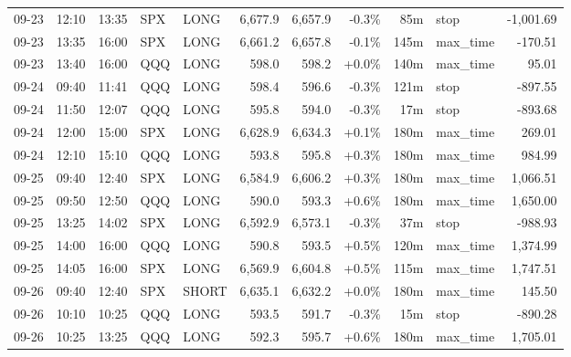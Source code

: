 \documentclass[11pt,a4paper,twoside]{article}
\begin{document}
\begin{center}
\begin{longtable}{>{\color{txtmain}}l l l l l r r r r >{\color{txtmain}}l r}
09-23 & 12:10 & 13:35 & SPX & LONG & 6,677.9 & 6,657.9 & \textcolor{lossred}{-0.3\%} & 85m & stop & \textcolor{lossred}{-1,001.69} \\
09-23 & 13:35 & 16:00 & SPX & LONG & 6,661.2 & 6,657.8 & \textcolor{lossred}{-0.1\%} & 145m & max\_time & \textcolor{lossred}{-170.51} \\
09-23 & 13:40 & 16:00 & QQQ & LONG & 598.0 & 598.2 & \textcolor{wingreen}{+0.0\%} & 140m & max\_time & \textcolor{wingreen}{95.01} \\
09-24 & 09:40 & 11:41 & QQQ & LONG & 598.4 & 596.6 & \textcolor{lossred}{-0.3\%} & 121m & stop & \textcolor{lossred}{-897.55} \\
09-24 & 11:50 & 12:07 & QQQ & LONG & 595.8 & 594.0 & \textcolor{lossred}{-0.3\%} & 17m & stop & \textcolor{lossred}{-893.68} \\
09-24 & 12:00 & 15:00 & SPX & LONG & 6,628.9 & 6,634.3 & \textcolor{wingreen}{+0.1\%} & 180m & max\_time & \textcolor{wingreen}{269.01} \\
09-24 & 12:10 & 15:10 & QQQ & LONG & 593.8 & 595.8 & \textcolor{wingreen}{+0.3\%} & 180m & max\_time & \textcolor{wingreen}{984.99} \\
09-25 & 09:40 & 12:40 & SPX & LONG & 6,584.9 & 6,606.2 & \textcolor{wingreen}{+0.3\%} & 180m & max\_time & \textcolor{wingreen}{1,066.51} \\
09-25 & 09:50 & 12:50 & QQQ & LONG & 590.0 & 593.3 & \textcolor{wingreen}{+0.6\%} & 180m & max\_time & \textcolor{wingreen}{1,650.00} \\
09-25 & 13:25 & 14:02 & SPX & LONG & 6,592.9 & 6,573.1 & \textcolor{lossred}{-0.3\%} & 37m & stop & \textcolor{lossred}{-988.93} \\
09-25 & 14:00 & 16:00 & QQQ & LONG & 590.8 & 593.5 & \textcolor{wingreen}{+0.5\%} & 120m & max\_time & \textcolor{wingreen}{1,374.99} \\
09-25 & 14:05 & 16:00 & SPX & LONG & 6,569.9 & 6,604.8 & \textcolor{wingreen}{+0.5\%} & 115m & max\_time & \textcolor{wingreen}{1,747.51} \\
09-26 & 09:40 & 12:40 & SPX & SHORT & 6,635.1 & 6,632.2 & \textcolor{wingreen}{+0.0\%} & 180m & max\_time & \textcolor{wingreen}{145.50} \\
09-26 & 10:10 & 10:25 & QQQ & LONG & 593.5 & 591.7 & \textcolor{lossred}{-0.3\%} & 15m & stop & \textcolor{lossred}{-890.28} \\
09-26 & 10:25 & 13:25 & QQQ & LONG & 592.3 & 595.7 & \textcolor{wingreen}{+0.6\%} & 180m & max\_time & \textcolor{wingreen}{1,705.01} \\

\end{longtable}
\end{center}
\end{document}
